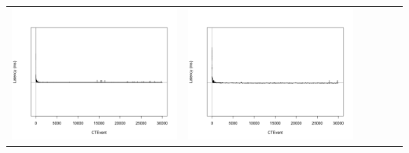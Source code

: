 \begin{table}[htbp]
{\begin{tabular}{l | ccccc}
\begin{minipage}{.15\textwidth}
     			 	\includegraphics[width=\linewidth]{images/lat-log-triple/N4}
    				 \end{minipage}
    			   &	 \begin{minipage}{.15\textwidth}\vspace{2pt}     							
     			 	\includegraphics[width=\linewidth]{images/lat-log-triple/N8}
    				 \end{minipage}
    			   &	 \begin{minipage}{.15\textwidth}\vspace{2pt}     							

\end{minipage}
\end{tabular}}
\end{table}
